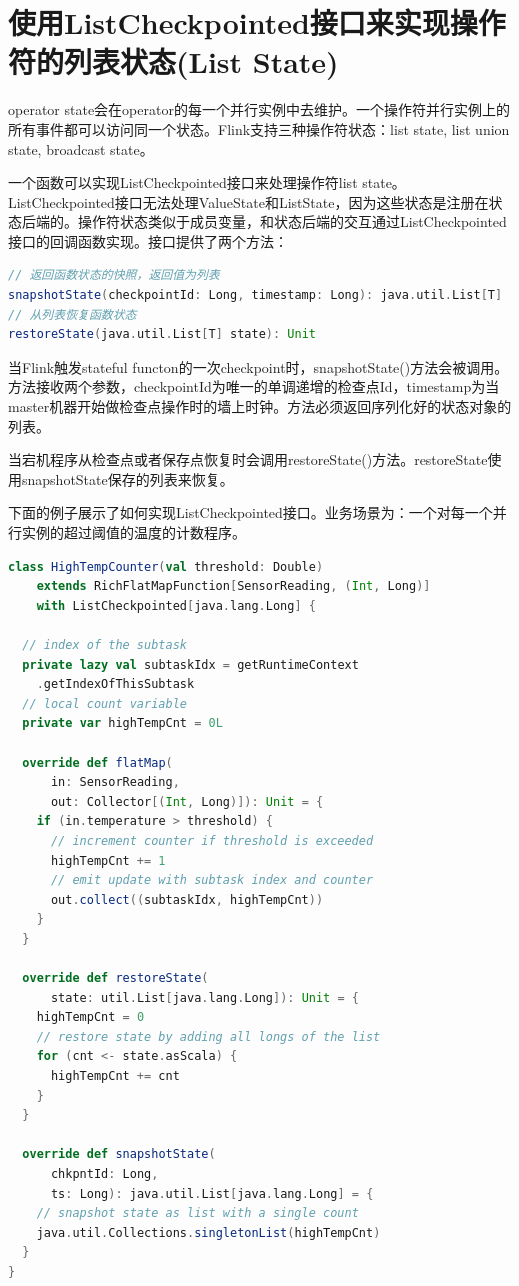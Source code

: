 \documentclass[oneside]{ctexbook}
\begin{document}
\section{使用ListCheckpointed接口来实现操作符的列表状态(List State)}

operator state会在operator的每一个并行实例中去维护。一个操作符并行实例上的所有事件都可以访问同一个状态。Flink支持三种操作符状态：list state, list union state, broadcast state。

一个函数可以实现ListCheckpointed接口来处理操作符list state。ListCheckpointed接口无法处理ValueState和ListState，因为这些状态是注册在状态后端的。操作符状态类似于成员变量，和状态后端的交互通过ListCheckpointed接口的回调函数实现。接口提供了两个方法：

\begin{lstlisting}[language=scala]
// 返回函数状态的快照，返回值为列表
snapshotState(checkpointId: Long, timestamp: Long): java.util.List[T]
// 从列表恢复函数状态
restoreState(java.util.List[T] state): Unit
\end{lstlisting}

当Flink触发stateful functon的一次checkpoint时，snapshotState()方法会被调用。方法接收两个参数，checkpointId为唯一的单调递增的检查点Id，timestamp为当master机器开始做检查点操作时的墙上时钟。方法必须返回序列化好的状态对象的列表。

当宕机程序从检查点或者保存点恢复时会调用restoreState()方法。restoreState使用snapshotState保存的列表来恢复。

下面的例子展示了如何实现ListCheckpointed接口。业务场景为：一个对每一个并行实例的超过阈值的温度的计数程序。

\begin{lstlisting}[language=scala]
class HighTempCounter(val threshold: Double)
    extends RichFlatMapFunction[SensorReading, (Int, Long)]
    with ListCheckpointed[java.lang.Long] {

  // index of the subtask
  private lazy val subtaskIdx = getRuntimeContext
    .getIndexOfThisSubtask
  // local count variable
  private var highTempCnt = 0L

  override def flatMap(
      in: SensorReading, 
      out: Collector[(Int, Long)]): Unit = {
    if (in.temperature > threshold) {
      // increment counter if threshold is exceeded
      highTempCnt += 1
      // emit update with subtask index and counter
      out.collect((subtaskIdx, highTempCnt))
    }
  }

  override def restoreState(
      state: util.List[java.lang.Long]): Unit = {
    highTempCnt = 0
    // restore state by adding all longs of the list
    for (cnt <- state.asScala) {
      highTempCnt += cnt
    }
  }

  override def snapshotState(
      chkpntId: Long, 
      ts: Long): java.util.List[java.lang.Long] = {
    // snapshot state as list with a single count
    java.util.Collections.singletonList(highTempCnt)
  }
}
\end{lstlisting}
\end{document}
